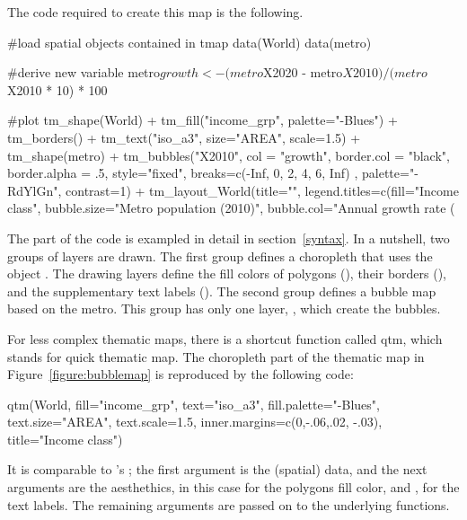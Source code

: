 The code required to create this map is the following.

\begin{example}
#load spatial objects contained in tmap
data(World)
data(metro)

#derive new variable
metro$growth <- (metro$X2020 - metro$X2010) / (metro$X2010 * 10) * 100

#plot
tm_shape(World) +
  tm_fill("income_grp", palette="-Blues") +
  tm_borders() +
  tm_text("iso_a3", size="AREA", scale=1.5) +
tm_shape(metro) +
  tm_bubbles("X2010", col = "growth", border.col = "black", 
    border.alpha = .5, style="fixed", breaks=c(-Inf, 0, 2, 4, 6, Inf) ,
    palette="-RdYlGn", contrast=1) + 
tm_layout_World(title="", legend.titles=c(fill="Income class", 
  bubble.size="Metro population (2010)", bubble.col="Annual growth rate (%
\end{example}

The  part of the code is exampled in detail in section~\ref{syntax}. In a nutshell, two groups of layers are drawn. The first group defines a choropleth that uses the  object . The drawing layers define the fill colors of polygons (), their borders (), and the supplementary text labels (). The second group defines a bubble map based on the  metro. This group has only one layer, , which create the bubbles.


For less complex thematic maps, there is a shortcut function called qtm, which stands for quick thematic map. The choropleth part of the thematic map in Figure~\ref{figure:bubblemap} is reproduced by the following code:

\begin{example}
qtm(World, fill="income_grp", text="iso_a3", 
  fill.palette="-Blues", 
  text.size="AREA", text.scale=1.5, 
  inner.margins=c(0,-.06,.02, -.03), title="Income class")
\end{example}

It is comparable to 's ; the first argument is the (spatial) data, and the next arguments are the aesthethics, in this case  for the polygons fill color, and , for the text labels. The remaining arguments are passed on to the underlying functions.






